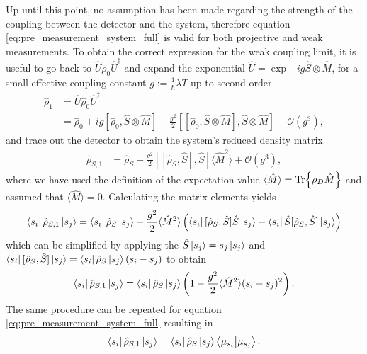\documentclass{article}
\begin{document}
Up until this point, 
no assumption has been made regarding the strength 
of the coupling between the detector and the system, therefore equation \eqref{eq:pre_measurement_system_full} is valid
for both projective and weak measurements. To obtain the correct expression for the weak 
coupling limit, it is useful to go back to
 $\hat{U}\rho_0 \hat{U}^\dagger$ and expand the exponential $\hat{U} = \exp{- i g \hat{S}\otimes\hat{M} }$, for a small effective
coupling constant $g := \frac{1}{\hbar} \lambda T$ up to second order
\begin{align}\label{eq:rho_expansion}
    \hat{\rho}_1  & = \hat{U}\hat{\rho}_0 \hat{U}^\dagger \nonumber \\
            & = \hat{\rho}_0  +i g [ \hat{\rho}_0,  \hat{S}\otimes\hat{M} ] - 
            \frac{g^2}{2}[ [ \hat{\rho}_0,  \hat{S}\otimes\hat{M} ] , \hat{S}\otimes\hat{M}] + \mathcal{O}(g^3),
\end{align}
and trace out the detector to obtain the system's reduced density matrix 
\begin{align*}
    \hat{\rho}_{S,1}  & = \hat{\rho}_S  -  \frac{g^2}{2}[ [ \hat{\rho}_S,  \hat{S}] , 
    \hat{S}] \langle \hat{M}^2\rangle + \mathcal{O}(g^3),
\end{align*}
where we have used the definition of the expectation value 
$\langle \hat{M}\rangle = \Tr{ \rho_D \hat{M}}$ and assumed that $\langle \hat{M}\rangle = 0$. Calculating the
matrix elements yields
\begin{align*}
    \bra{s_i}\hat{\rho}_{S,1}\ket{s_j} = \bra{s_i}\hat{\rho}_{S}\ket{s_j} - \frac{g^2}{2}\langle 
        \hat{M}^2\rangle\left( 
        \bra{s_i}[\hat{\rho}_{S},\hat{S}] \hat{S}\ket{s_j} - \bra{s_i}\hat{S}[\hat{\rho}_{S},\hat{S}] \ket{s_j}   \right)
\end{align*}
which can be simplified by applying the $\hat{S}\ket{s_j} = s_j\ket{s_j}$ and $\bra{s_i}[\hat{\rho}_{S},\hat{S}] \ket{s_j} = \bra{s_i}\hat{\rho}_{S}\ket{s_j} \left( s_i - s_j \right)$ to obtain 
\begin{align}\label{eq:pre_measurement_system_expansion}
    \bra{s_i}\hat{\rho}_{S,1}\ket{s_j} = \bra{s_i}\hat{\rho}_{S}\ket{s_j} \left(1 - \frac{g^2}{2} 
    \langle \hat{M}^2\rangle (s_i - s_j)^2 \right).
\end{align}
The same procedure can be repeated for equation \eqref{eq:pre_measurement_system_full} resulting in 
\begin{align}\label{eq:pre_measurement_system_full_elements}
    \bra{s_i}\hat{\rho}_{S,1}\ket{s_j} =  \bra{s_i}\hat{\rho}_{S}\ket{s_j} \bra{\mu_{s_i}}\ket{\mu_{s_j}}.
\end{align}
\end{document}
